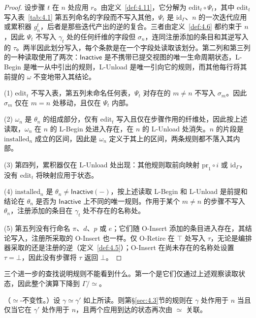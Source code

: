 \begin{proof}
设步骤 $t$ 在 $n$ 处应用 $r$。由定义~\ref{def:4.11}，它分解为 $\mathrm{edit}_t \circ \Psi_t$，其中 $\mathrm{edit}_t$ 写入表~\ref{tab:4.1} 第五列命名的字段而不写入其他，$\Psi_t$ 是 $\mathrm{id}_\Gamma$、$n$ 的一次迭代应用或累积器 $g^t_n$，后者是那些迭代产出的逆的复合。三者由定义~\ref{def:4.6} 都约束于 $n$，因此 $\Psi_t$ 不写入 $\gamma_t$ 处的任何纤维的字段但 $\sigma_n$，连同注册添加的条目和其逆写入的 $\tau$。两半因此划分写入，每个条款是在一个字段处读取该划分。第二列和第三列的一种读取使用了两次：$\mathsf{Inactive}$ 是不携带已提交视图的唯一生命周期状态，L-Begin 是唯一从中引出的规则，L-Unload 是唯一引向它的规则，而其他每行将其前提的 $\omega$ 不变地带入其结论。

(1) $\mathrm{edit}_t$ 不写入表，第五列未命名任何表，$\Psi_t$ 对存在的 $m \neq n$ 不写入 $\sigma_m$。因此 $\sigma_m$ 仅在 $m = n$ 处移动，且仅在 $\Psi_t$ 内部。

(2) $\omega_n$ 是 $\theta_n$ 的组成部分，仅有 $\mathrm{edit}_t$ 写入且仅在步骤作用的纤维处，因此按上述读取，$\omega_n$ 在 $n$ 的 L-Begin 处进入存在，在 $n$ 的 L-Unload 处消失。$n$ 的片段是 $\mathrm{installed}_n$ 成立的区间，因此是 $\omega_n$ 定义于其上的区间，两条规则都不落入其内部。

(3) 第四列，累积器仅在 L-Unload 处出现：其他规则取前向映射 $\mathrm{pr}_1 \circ i$ 或 $\mathrm{id}_\Gamma$，没有 $\mathrm{edit}_t$ 将映射应用于状态。

(4) $\mathrm{installed}_n$ 是 $\theta_n \neq \mathsf{Inactive}(-)$，按上述读取 L-Begin 和 L-Unload 是前提和结论在 $\theta_n$ 是否为 $\mathsf{Inactive}$ 上不同的唯一规则。作用于某个 $m \neq n$ 的步骤不写入 $\theta_n$，注册添加的条目在 $\gamma_t$ 处不存在的名称处。

(5) 第五列没有行命名 $\pi$、$d$、$p$ 或 $e$；它们随 O-Insert 添加的条目进入存在，其结论写入，注册所采取的 O-Insert 也一样。仅 O-Retire 在 $\top$ 处写入 $\tau$，无论是编排器采取的还是注册的逆（定义~\ref{def:4.5}）；O-Insert 在尚未存在的名称处设置 $\tau = \bot$，因此没有步骤将 $\tau$ 返回 $\bot$。
\end{proof}

三个进一步的查找说明规则不能看到什么。第一个是它们仅通过上述观察读取状态，因此整个演算下降到 $\Gamma/{\simeq}$。

\begin{lemma}\label{lem:4.2}
（$\simeq$-不变性。）设 $\gamma \simeq \gamma'$ 如上所读。则第\S\ref{sec:4.3}节的规则在 $\gamma$ 处作用于 $n$ 当且仅当它在 $\gamma'$ 处作用于 $n$，且两个应用到达的状态再次由 $\simeq$ 关联。
\end{lemma}

